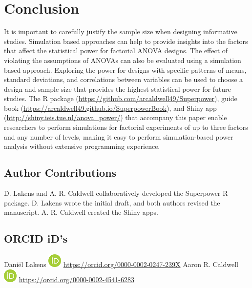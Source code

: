 \documentclass[
  ,man,floatsintext]{apa6}
\begin{document}
\hypertarget{conclusion}{%
\section{Conclusion}\label{conclusion}}

It is important to carefully justify the sample size when designing informative studies.
Simulation based approaches can help to provide insights into the factors that affect the statistical power for factorial ANOVA designs. The effect of violating the assumptions of ANOVAs can also be evaluated using a simulation based approach.
Exploring the power for designs with specific patterns of means, standard deviations, and correlations between variables can be used to choose a design and sample size that provides the highest statistical power for future studies. The R package (\url{https://github.com/arcaldwell49/Superpower}), guide book (\url{https://arcaldwell49.github.io/SuperpowerBook}), and Shiny app (\url{http://shiny.ieis.tue.nl/anova_power/}) that accompany this paper enable researchers to perform simulations for factorial experiments of up to three factors and any number of levels, making it easy to perform simulation-based power analysis without extensive programming experience.

\hypertarget{author-contributions}{%
\subsection{Author Contributions}\label{author-contributions}}

D. Lakens and A. R. Caldwell collaboratively developed the Superpower R package. D. Lakens wrote the initial draft, and both authors revised the manuscript. A. R. Caldwell created the Shiny apps.

\hypertarget{orcid-ids}{%
\subsection{ORCID iD's}\label{orcid-ids}}

Daniël Lakens \includegraphics{screenshots/orcid.png} \url{https://orcid.org/0000-0002-0247-239X}
Aaron R. Caldwell \includegraphics{screenshots/orcid.png} \url{https://orcid.org/0000-0002-4541-6283}
\end{document}
